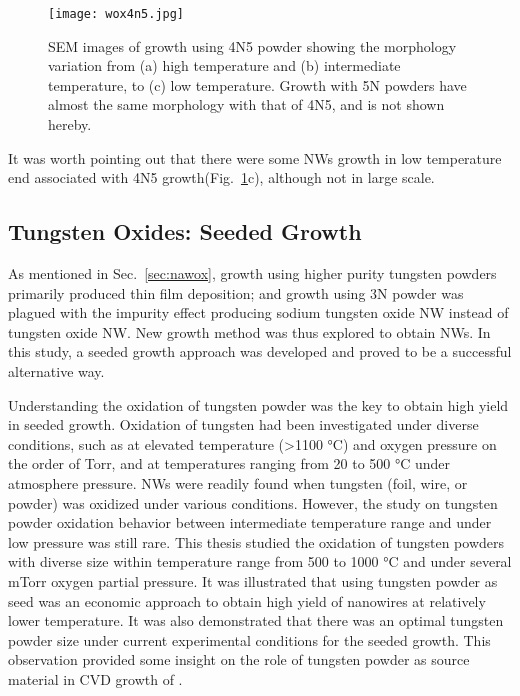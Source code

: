 \begin{figure}[htb]
\centering
\texttt{[image: wox4n5.jpg]}
\caption[SEM images of  growth using 4N5 powder]{SEM images of  growth using 4N5 powder showing the morphology variation from (a) high temperature and (b) intermediate temperature, to (c) low temperature. Growth with 5N powders have almost the same morphology with that of 4N5, and is not shown hereby.}
\label{fig:wox4n5}
\end{figure}
It was worth pointing out that there were some NWs growth in low temperature end associated with 4N5 growth(Fig.~\ref{fig:wox4n5}c), although not in large scale.

\subsection{Tungsten Oxides: Seeded Growth}\label{sec:sgfg}

As mentioned in Sec.~\ref{sec:nawox}, growth using higher purity tungsten powders primarily produced thin film deposition; and growth using 3N powder was plagued with the impurity effect producing sodium tungsten oxide NW instead of tungsten oxide NW. New growth method was thus explored to obtain  NWs. In this study, a seeded growth approach was developed and proved to be a successful alternative way. 

Understanding the oxidation of tungsten powder was the key to obtain high yield in seeded growth. Oxidation of tungsten had been investigated under diverse conditions, such as at elevated temperature (\textgreater 1100 \si{\degreeCelsius}) and oxygen pressure on the order of Torr,\cite{Gulbransen1960} and at temperatures ranging from 20 to 500 \si{\degreeCelsius} under atmosphere pressure.\cite{Warren1996}  NWs were readily found when tungsten (foil, wire, or powder) was oxidized under various conditions.\cite{Zhu1999,Karuppanan2007,Hsieh2010} However, the study on tungsten powder oxidation behavior between intermediate temperature range and under low pressure was still rare. This thesis studied the oxidation of tungsten powders with diverse size within temperature range from 500 to 1000 \si{\degreeCelsius} and under several mTorr oxygen partial pressure. It was illustrated that using tungsten powder as seed was an economic approach to obtain high yield of  nanowires at relatively lower temperature. It was also demonstrated that there was an optimal tungsten powder size under current experimental conditions for the seeded growth. This observation provided some insight on the role of tungsten powder as source material in CVD growth of .


